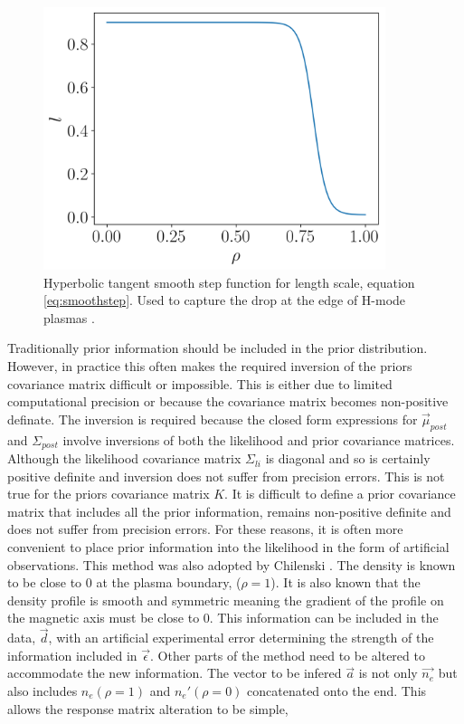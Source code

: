 \begin{figure}[H]
  \centering
  \includegraphics[width=10cm]{images/smoothstep.png}
  \caption{Hyperbolic tangent smooth step function for length scale, equation \ref{eq:smoothstep}. Used to capture the drop at the edge of H-mode plasmas \cite{chilenski}.}
  \label{fig:smoothstep}
\end{figure}

Traditionally prior information should be included in the prior distribution. However, in practice this often makes the required inversion of the priors covariance matrix difficult or impossible. This is either due to limited computational precision or because the covariance matrix becomes non-positive definate. The inversion is required because the closed form expressions for $\vec{\mu}_{post}$ and $\Sigma_{post}$ involve inversions of both the likelihood and prior covariance matrices. Although the likelihood covariance matrix $\Sigma_{li}$ is diagonal and so is certainly positive definite and inversion does not suffer from precision errors. This is not true for the priors covariance matrix $K$. It is difficult to define a prior covariance matrix that includes all the prior information, remains non-positive definite and does not suffer from precision errors. For these reasons, it is often more convenient to place prior information into the likelihood in the form of artificial observations. This method was also adopted by Chilenski \cite{chilenski}. The density is known to be close to 0 at the plasma boundary, ($\rho=1$). It is also known that the density profile is smooth and symmetric meaning the gradient of the profile on the magnetic axis must be close to 0. This information can be included in the data, $\vec{d}$, with an artificial experimental error determining the strength of the information included in $\vec{\epsilon}$. Other parts of the method need to be altered to accommodate the new information. The vector to be infered $\vec{a}$ is not only $\vec{n_e}$ but also includes $n_e(\rho=1)$ and $n_e'(\rho=0)$ concatenated onto the end. This allows the response matrix alteration to be simple,

